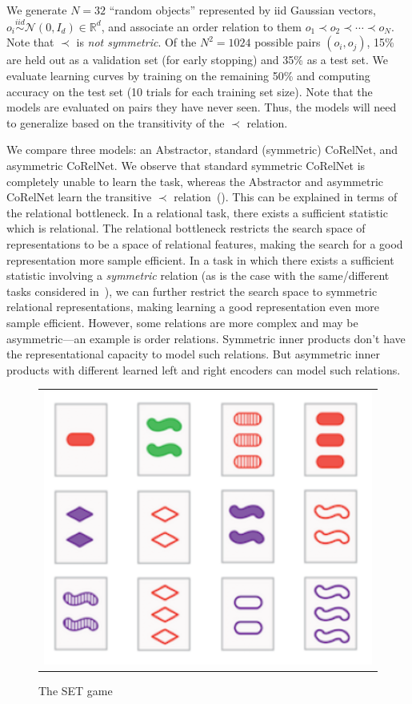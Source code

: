 We generate $N = 32$ ``random objects'' represented by iid Gaussian vectors, $o_i \overset{iid}{\sim} \mathcal{N}(0,
I_d) \in \mathbb{R}^d$, and associate an order relation to them $o_1 \prec o_2 \prec \cdots \prec o_N$. Note that $\prec$ is \textit{not symmetric}. Of the $N^2 = 1024$ possible pairs $(o_i, o_j)$, 15\% are held out as a validation set (for early stopping) and 35\% as a test set. We evaluate learning curves by training on the remaining 50\% and computing accuracy on the test set (10 trials for each training set size). Note that the models are evaluated on pairs they have never seen. Thus, the models will need to generalize based on the transitivity of the $\prec$ relation.

We compare three models: an Abstractor, standard (symmetric) CoRelNet, and asymmetric CoRelNet. We observe that standard symmetric CoRelNet is completely unable to learn the task, whereas the Abstractor and asymmetric CoRelNet learn the transitive $\prec$ relation~(). This can be explained in terms of the relational bottleneck. In a relational task, there exists a sufficient statistic which is relational. The relational bottleneck restricts the search space of representations to be a space of relational features, making the search for a good representation more sample efficient. In a task in which there exists a sufficient statistic involving a \textit{symmetric} relation (as is the case with the same/different tasks considered in~\citep{kerg2022neural}), we can further restrict the search space to symmetric relational representations, making learning a good representation even more sample efficient.
However, some relations are more complex and may be asymmetric---an example is order relations. Symmetric inner products don't have the representational capacity to model such relations. But asymmetric inner products with different learned left and right encoders can model such relations.



\begin{figure}
	\vskip-5pt
	\begin{tabular}{c}
		\includegraphics[width=.25\textwidth]{figures/set_example}\\[-5pt]
	\end{tabular}
	\caption{\footnotesize The SET game}\label{fig:set_example}
\end{figure}
